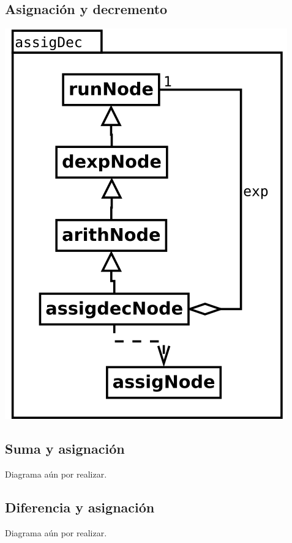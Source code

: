 \subsection {Asignación y decremento}
\begin{center}
\includegraphics[scale=0.4]{assigDec.png} \\
\end{center}

\subsection {Suma y asignación}
Diagrama aún por realizar.

\subsection {Diferencia y asignación}
Diagrama aún por realizar.

